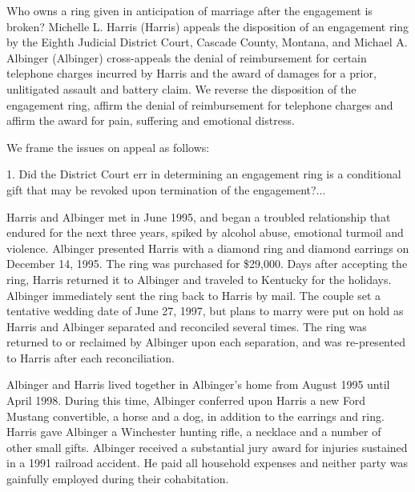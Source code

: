 

Who owns a ring given in anticipation of marriage after the engagement is
broken? Michelle L. Harris (Harris) appeals the disposition of an engagement
ring by the Eighth Judicial District Court, Cascade County, Montana, and
Michael A. Albinger (Albinger) cross-appeals the denial of reimbursement for
certain telephone charges incurred by Harris and the award of damages for a
prior, unlitigated assault and battery claim. We reverse the disposition of the
engagement ring, affirm the denial of reimbursement for telephone charges and
affirm the award for pain, suffering and emotional distress. 

We frame the issues on appeal as follows: 

1. Did the District Court err in determining an engagement ring is a conditional
gift that may be revoked upon termination of the engagement?...


Harris and Albinger met in June 1995, and began a troubled relationship that
endured for the next three years, spiked by alcohol abuse, emotional turmoil
and violence. Albinger presented Harris with a diamond ring and diamond
earrings on December 14, 1995. The ring was purchased for \$29,000. Days after
accepting the ring, Harris returned it to Albinger and traveled to Kentucky for
the holidays. Albinger immediately sent the ring back to Harris by mail. The
couple set a tentative wedding date of June 27, 1997, but plans to marry were
put on hold as Harris and Albinger separated and reconciled several times. The
ring was returned to or reclaimed by Albinger upon each separation, and was
re-presented to Harris after each reconciliation. 

Albinger and Harris lived together in Albinger's home from August 1995 until
April 1998. During this time, Albinger conferred upon Harris a new Ford Mustang
convertible, a horse and a dog, in addition to the earrings and ring. Harris
gave Albinger a Winchester hunting rifle, a necklace and a number of other
small gifts. Albinger received a substantial jury award for injuries sustained
in a 1991 railroad accident. He paid all household expenses and neither party
was gainfully employed during their cohabitation. 

